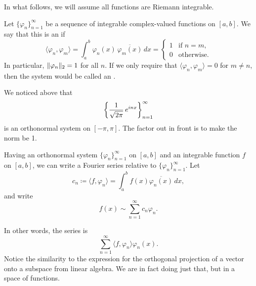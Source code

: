 In what follows, we will
assume all functions are Riemann integrable.

\begin{defn}
Let $\{ \varphi_n \}_{n=1}^\infty$ be a sequence of integrable complex-valued
functions on $[a,b]$.  We say that this is an
\emph{} if
\begin{equation*}
\langle \varphi_n , \varphi_m \rangle
=
\int_a^b \varphi_n(x) \, \overline{\varphi_m(x)} \, dx
= 
\begin{cases}
1 & \text{if } n=m, \\
0 & \text{otherwise.}
\end{cases}
\end{equation*}
In particular, $\lVert {\varphi_n} \rVert_2 = 1$ for all $n$.  If we
only require that 
$\langle \varphi_n , \varphi_m \rangle = 0$ for $m \neq n$, then
the system would be called an \emph{}.
\end{defn}

We noticed above that
\begin{equation*}
{\left\{ \frac{1}{\sqrt{2\pi}} \, e^{inx} \right\}}_{n=1}^\infty
\avoidbreak
\end{equation*}
is an orthonormal system on $[-\pi,\pi]$.
The factor out in front is to make the norm be 1.

Having an orthonormal system $\{ \varphi_n \}_{n=1}^\infty$ on $[a,b]$ and an integrable function $f$
on $[a,b]$, we can write
a Fourier series relative to $\{ \varphi_n \}_{n=1}^\infty$.  Let
\begin{equation*}
c_n \coloneqq
\langle f , \varphi_n \rangle
=
\int_a^b f(x) \overline{\varphi_n(x)} \, dx ,
\end{equation*}
and write
\begin{equation*}
f(x) \sim \sum_{n=1}^\infty c_n \varphi_n .
\end{equation*}

In other words, the series is
\begin{equation*}
\sum_{n=1}^\infty \langle f , \varphi_n \rangle \varphi_n(x) .
\end{equation*}
Notice the similarity to the expression for the orthogonal
projection of a vector onto a subspace from linear algebra.  We are
in fact doing just that, but in a space of functions.

